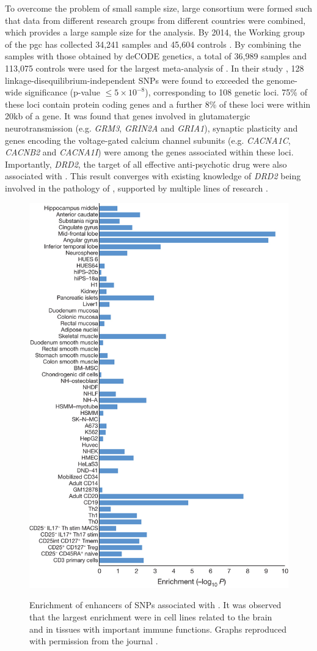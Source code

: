 	To overcome the problem of small sample size, large consortium were formed such that data from different research groups from different countries were combined, which provides a large sample size for the analysis.
	By 2014, the  Working group of the \gls{pgc} has collected 34,241  samples and 45,604 controls \citep{Ripke2014}.
	By combining the samples with those obtained by deCODE genetics, a total of 36,989  samples and 113,075 controls were used for the largest meta-analysis of .
	In their study \citep{Ripke2014}, 128 linkage-disequilibrium-independent \glspl{SNP} were found to  exceeded the genome-wide significance (p-value $\le 5\times10^{-8}$), corresponding to 108 genetic loci.
	75\% of these loci contain protein coding genes and a further 8\% of these loci were within 20\gls{kb} of a gene. 
	It was found that genes involved in glutamatergic neurotransmission (e.g. \textit{GRM3}, \textit{GRIN2A} and \textit{GRIA1}), synaptic plasticity and genes encoding the voltage-gated calcium channel subunits (e.g. \textit{CACNA1C}, \textit{CACNB2} and \textit{CACNA1I}) were among the genes associated within these loci.
	Importantly, \textit{DRD2}, the target of all effective anti-psychotic drug were also associated with .
	This result converges with existing knowledge of \textit{DRD2} being involved in the pathology of , supported by multiple lines of research \citep{Talkowski2007}.
	\begin{figure}
		\centering
		\caption[Enrichment of enhancers of SNPs associated with Schizophrenia]{Enrichment of enhancers of SNPs associated with . 
			It was observed that the largest enrichment were in cell lines related to the brain and in tissues with important immune functions. 
			Graphs reproduced with permission from the journal \citep{Ripke2014}.}
		\includegraphics[height=\textwidth]{figure/pgc_enrichment_tissue.jpg}
		\label{fig:pgcEnrich}
	\end{figure}
